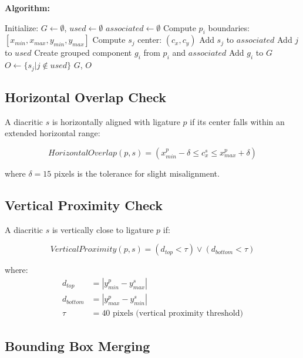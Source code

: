 \documentclass[12pt,a4paper,oneside]{report}
\begin{document}
\textbf{Algorithm:}
\begin{algorithmic}[1]
\STATE Initialize: $G \leftarrow \emptyset$, $used \leftarrow \emptyset$
    \STATE $associated \leftarrow \emptyset$
    \STATE Compute $p_i$ boundaries: $[x_{min}, x_{max}, y_{min}, y_{max}]$
        \STATE Compute $s_j$ center: $(c_x, c_y)$
            \STATE Add $s_j$ to $associated$
            \STATE Add $j$ to $used$
        \ENDIF
    \ENDFOR
    \STATE Create grouped component $g_i$ from $p_i$ and $associated$
    \STATE Add $g_i$ to $G$
\ENDFOR
\STATE $O \leftarrow \{s_j | j \notin used\}$
\RETURN $G$, $O$
\end{algorithmic}

\subsection{Horizontal Overlap Check}

A diacritic $s$ is horizontally aligned with ligature $p$ if its center falls within an extended horizontal range:

\begin{equation}
    HorizontalOverlap(p, s) = (x_{min}^p - \delta \leq c_x^s \leq x_{max}^p + \delta)
\end{equation}

where $\delta = 15$ pixels is the tolerance for slight misalignment.

\subsection{Vertical Proximity Check}

A diacritic $s$ is vertically close to ligature $p$ if:

\begin{equation}
    VerticalProximity(p, s) = (d_{top} < \tau) \vee (d_{bottom} < \tau)
\end{equation}

where:
\begin{align}
    d_{top} &= |y_{min}^p - y_{max}^s| \\
    d_{bottom} &= |y_{max}^p - y_{min}^s| \\
    \tau &= 40 \text{ pixels (vertical proximity threshold)}
\end{align}

\subsection{Bounding Box Merging}
\end{document}
